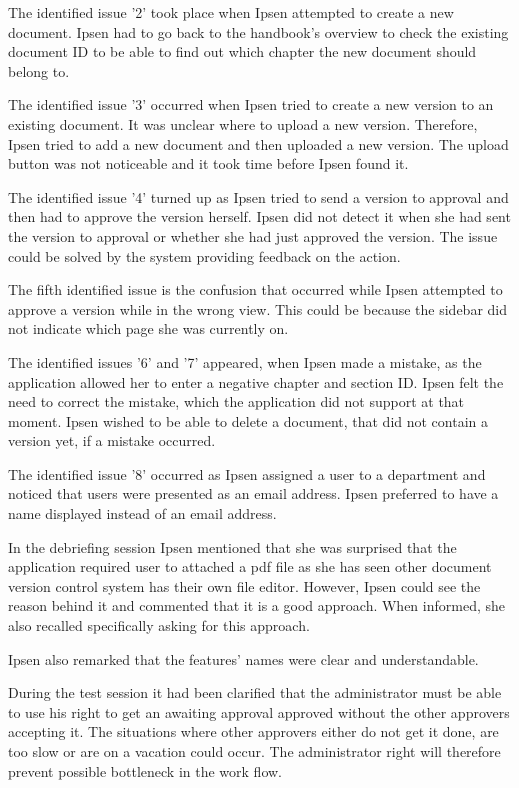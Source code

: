 \documentclass[../../master.tex]{subfiles}
\begin{document}
The identified issue '2' took place when Ipsen attempted to create a new document.
Ipsen had to go back to the handbook's overview to check the existing document ID to be able to find out which chapter the new document should belong to.

The identified issue '3' occurred when Ipsen tried to create a new version to an existing document.
It was unclear where to upload a new version.
Therefore, Ipsen tried to add a new document and then uploaded a new version.
The upload button was not noticeable and it took time before Ipsen found it.

The identified issue '4' turned up as Ipsen tried to send a version to approval and then had to approve the version herself.
Ipsen did not detect it when she had sent the version to approval or whether she had just approved the version.
The issue could be solved by the system providing feedback on the action.

The fifth identified issue is the confusion that occurred while Ipsen attempted to approve a version while in the wrong view.
This could be because the sidebar did not indicate which page she was currently on.

The identified issues '6' and '7' appeared, when Ipsen made a mistake, as the application allowed her to enter a negative chapter and section ID.
Ipsen felt the need to correct the mistake, which the application did not support at that moment.
Ipsen wished to be able to delete a document, that did not contain a version yet, if a mistake occurred.

The identified issue '8' occurred as Ipsen assigned a user to a department and noticed that users were presented as an email address.
Ipsen preferred to have a name displayed instead of an email address.

In the debriefing session Ipsen mentioned that she was surprised that the application required user to attached a pdf file as she has seen other document version control system has their own file editor.
However, Ipsen could see the reason behind it and commented that it is a good approach.
When informed, she also recalled specifically asking for this approach.

Ipsen also remarked that the features' names were clear and understandable.

During the test session it had been clarified that the administrator must be able to use his right to get an awaiting approval approved without the other approvers accepting it.
The situations where other approvers either do not get it done, are too slow or are on a vacation could occur.
The administrator right will therefore prevent possible bottleneck in the work flow.
\end{document}
